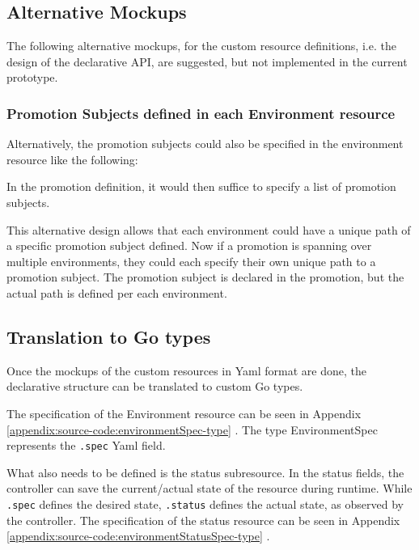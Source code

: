 \subsection{Alternative Mockups}
\label{prototype:design:alternative-mockups}

The following alternative mockups,
for the custom resource definitions,
i.e. the design of the declarative API,
are suggested, but not implemented in the current prototype.

\subsubsection*{Promotion Subjects defined in each Environment resource}

Alternatively, the promotion subjects could also be specified
in the environment resource like the following:



In the promotion definition,
it would then suffice to specify
a list of promotion subjects.



This alternative design allows that each environment could have
a unique path of a specific promotion subject defined.
Now if a promotion is spanning over multiple environments,
they could each specify their own unique path to a promotion subject.
The promotion subject is declared in the promotion,
but the actual path is defined per each environment.

\subsection{Translation to Go types}
\label{prototype:design:go-types}

Once the mockups of the custom resources in Yaml format are done,
the declarative structure can be translated to custom Go types.

The specification of the Environment resource can be seen in Appendix
\ref{appendix:source-code:environmentSpec-type} .
The type EnvironmentSpec represents the \lstinline|.spec| Yaml field.

What also needs to be defined is the status subresource.
In the status fields, the controller can save the current/actual state
of the resource during runtime.
While \lstinline|.spec| defines the desired state,
\lstinline|.status| defines the actual state, as observed by the controller.
The specification of the status resource can be seen in Appendix
\ref{appendix:source-code:environmentStatusSpec-type} .

